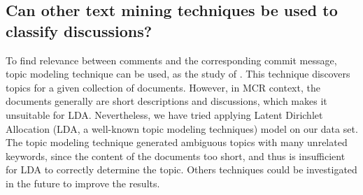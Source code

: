%
% 
% 
%
%
%

\subsection{Can other text mining techniques be used to classify discussions?}
To find relevance between comments and the corresponding commit message,
topic modeling technique can be used, as the study of \cite{Barua2012a}.
This technique discovers topics for a given collection of documents.
However, in MCR context, the documents generally are short descriptions and discussions, which makes it unsuitable for LDA.
Nevertheless, we have tried applying Latent Dirichlet Allocation (LDA, a well-known topic modeling techniques) model on our data set.
The topic modeling technique generated ambiguous topics with many unrelated keywords, since the content of the documents too short, and thus is insufficient for LDA to correctly determine the topic.
Others techniques could be investigated in the future to improve the results.

